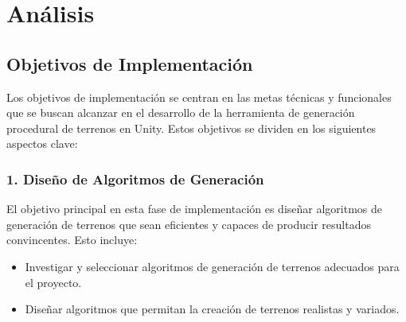 




\section{Análisis}

\subsection{Objetivos de Implementación}

Los objetivos de implementación se centran en las metas técnicas y funcionales que se buscan alcanzar en el desarrollo de la herramienta de generación procedural de terrenos en Unity. Estos objetivos se dividen en los siguientes aspectos clave:

\subsubsection{1. Diseño de Algoritmos de Generación}

El objetivo principal en esta fase de implementación es diseñar algoritmos de generación de terrenos que sean eficientes y capaces de producir resultados convincentes. Esto incluye:

\begin{itemize}
    \item Investigar y seleccionar algoritmos de generación de terrenos adecuados para el proyecto.
    \item Diseñar algoritmos que permitan la creación de terrenos realistas y variados.
\end{itemize}

